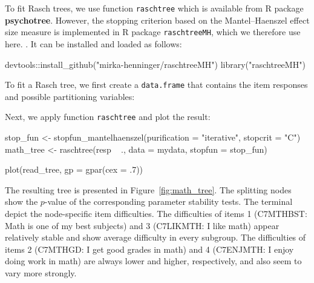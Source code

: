 \documentclass[doc,floatsintext,natbib]{apa7}
\begin{document}
To fit Rasch trees, we use function \verb|raschtree| which is available from R package \textbf{psychotree}. However, the stopping criterion based on the Mantel–Haenszel effect size measure is implemented in R package \verb|raschtreeMH|, which we therefore use here. . It can be installed and loaded as follows:

\begin{Schunk}
\begin{Sinput}
 devtools::install_github("mirka-henninger/raschtreeMH")
 library("raschtreeMH")
\end{Sinput}
\end{Schunk}


To fit a Rasch tree, we first create a \verb|data.frame| that contains the item responses and possible partitioning variables:

\begin{Schunk}
\end{Schunk}

Next, we apply function \verb|raschtree| and plot the result:

\begin{Schunk}
\begin{Sinput}
 stop_fun <- stopfun_mantelhaenszel(purification = "iterative", stopcrit = "C")
 math_tree <- raschtree(resp ~ ., data = mydata, stopfun = stop_fun)
\end{Sinput}
\end{Schunk}

\begin{Schunk}
\begin{Sinput}
 plot(read_tree, gp = gpar(cex = .7))
\end{Sinput}
\end{Schunk}

The resulting tree is presented in Figure~\ref{fig:math_tree}. The splitting nodes show the $p$-value of the corresponding parameter stability tests. The terminal depict the node-specific item difficulties. The difficulties of items 1 (C7MTHBST: Math is one of my best subjects) and 3 (C7LIKMTH: I like math) appear relatively stable and show average difficulty in every subgroup. The difficulties of items 2 (C7MTHGD: I get good grades in math) and 4 (C7ENJMTH: I enjoy doing work in math) are always lower and higher, respectively, and also seem to vary more strongly. 
\end{document}
